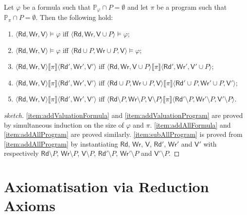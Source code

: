\documentclass{llncs}
\newcommand{\readset}{\mathsf{Rd}}
\newcommand{\valuset}{\mathsf{V}}
\newcommand{\writeset}{\mathsf{Wr}}
\newcommand{\intPgm}[1]{\llbracket #1 \rrbracket}
\renewcommand{\phi}{\varphi}
\newcommand{\propset}{\mathbb P}
\newcommand{\propsetOf}[1]{\propset_{#1}}
\newcommand{\tuple}[1]{ \langle #1 \rangle}
\begin{document}
\begin{lemma}\label{theo:irrelevantVariables}
Let $\phi$ be a formula such that $\propsetOf \phi \cap P = \emptyset$ and
let $ \pi$ be a program such that $\propsetOf \pi \cap P = \emptyset$. Then the following hold:
\begin{enumerate}
\item\label{item:addValuationFormula}
$\tuple{\readset,\writeset,\valuset} \models \phi $ iff
$\tuple{\readset,\writeset,\valuset\cup P} \models \phi$;
\item\label{item:addAllFormula}
$\tuple{\readset,\writeset,\valuset} \models \phi $ iff
$\tuple{\readset\cup P,\writeset\cup P,\valuset} \models \phi$;
\item\label{item:addValuationProgram}
$\tuple{\readset,\writeset,\valuset} \intPgm \pi \tuple{\readset',\writeset',\valuset'} $ iff
$\tuple{\readset,\writeset,\valuset\cup P} \intPgm \pi \tuple{\readset',\writeset',\valuset'\cup P} $;
\item\label{item:addAllProgram}
$\tuple{\readset,\writeset,\valuset} \intPgm \pi \tuple{\readset',\writeset',\valuset'} $ iff
$\tuple{\readset\cup P,\writeset\cup P,\valuset} \intPgm \pi \tuple{\readset'\cup P,\writeset'\cup P,\valuset'} $;
\item\label{item:subAllProgram}
$\tuple{\readset,\writeset,\valuset} \intPgm \pi \tuple{\readset',\writeset',\valuset'} $ iff
$\tuple{\readset\setminus P,\writeset\setminus P,\valuset\setminus P} \intPgm \pi \tuple{\readset'\setminus P,\writeset'\setminus P,\valuset'\setminus P} $.
\end{enumerate}
\end{lemma}
\begin{proof}[sketch]
\ref{item:addValuationFormula} and \ref{item:addValuationProgram} are proved by simultaneous
induction on the size of $\phi$ and $\pi$.
\ref{item:addAllFormula} and \ref{item:addAllProgram} are proved similarly.
\ref{item:subAllProgram} is proved from \ref{item:addAllProgram} by instantiating $\readset$,
$\writeset$, $\valuset$, $\readset'$, $\writeset'$ and $\valuset'$ with respectively
$\readset\setminus P$, $\writeset\setminus P$, $\valuset\setminus P$, $\readset'\setminus P$,
$\writeset'\setminus P$ and $\valuset'\setminus P$.
\end{proof}



\section{Axiomatisation via Reduction Axioms}\label{sec:axiomatisation}
\end{document}
